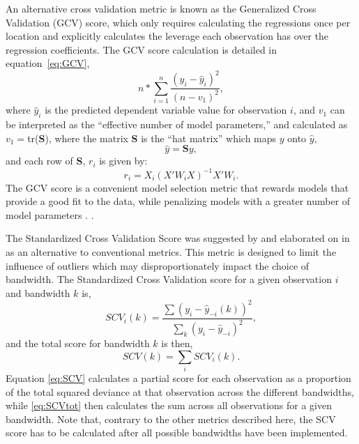 \documentclass{article}\usepackage[]{graphicx}\usepackage[]{color}
\begin{document}
An alternative cross validation metric is known as the Generalized Cross Validation (GCV) score, which only requires calculating the regressions once per location and explicitly calculates the leverage each observation has over the regression coefficients. The GCV score calculation is detailed in equation~\eqref{eq:GCV},
\begin{equation}\label{eq:GCV}
n*\sum_{i=1}^{n}\frac{(y_i-\hat{y}_i)^2}{(n-v_1)^2}, 
\end{equation} 
where $\hat{y}_i$ is the predicted dependent variable value for observation $i$, and $v_1$ can be interpreted as the ``effective number of model parameters,'' and calculated as $v_1=$tr(\textbf{S}), where the matrix \textbf{S} is the ``hat matrix'' which maps $y$ onto $\hat{y}$,
                   \begin{equation}
                   \hat{y}=\textbf{S}y,
                   \end{equation}
                   and each row of \textbf{S}, $r_i$ is given by:
                  \begin{equation}
                   r_i=X_i(X'W_iX)^{-1}X'W_i.
                   \end{equation}
The GCV score is a convenient model selection metric that rewards models that provide a good fit to the data, while penalizing models with a greater number of model parameters \citep{Loader1999, McMillen2010}.  \citep{Paez2011, McMillen2010, McMillen2012}. 

The Standardized Cross Validation Score was suggested by \citep{Farber2007b} and elaborated on in \citep{Paez2011} as an alternative to conventional metrics. This metric is designed to limit the influence of outliers which may disproportionately impact the choice of bandwidth. The Standardized Cross Validation score for a given observation $i$ and bandwidth $k$ is, 
\begin{equation}\label{eq:SCV}
SCV_i (k) = \frac{\sum (y_i - \hat{y}_{-i}(k))^2} {\sum _k (y_i - \hat{y}_{-i})^2 },
\end{equation}
and the total score for bandwidth $k$ is then,
\begin{equation}\label{eq:SCVtot}
SCV(k) = \sum _i SCV_i(k).
\end{equation}
Equation \eqref{eq:SCV} calculates a partial score for each observation as a proportion of the total squared deviance at that observation across the different bandwidths, while \eqref{eq:SCVtot} then calculates the sum across all observations for a given bandwidth. Note that, contrary to the other metrics described here, the SCV score has to be calculated after all possible bandwidths have been implemented.
\end{document}
